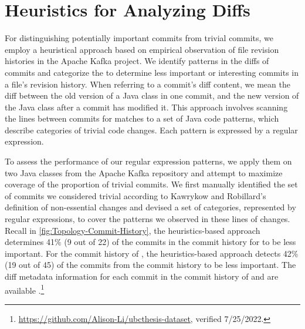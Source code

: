 \section{Heuristics for Analyzing Diffs}
\label{sec:Heuristics}

For distinguishing potentially important commits from trivial commits, 
we employ a heuristical approach based on empirical observation of file revision histories in the Apache Kafka project.
We identify patterns in the diffs of commits and categorize the  
to determine less important or interesting commits in a file's revision history.
When referring to a commit's diff content, we mean the diff between the old version of a Java class in one commit, 
and the new version of the Java class after a commit has modified it.
This approach involves scanning the lines between commits for matches to a set of Java code patterns, 
which describe categories of trivial code changes.
Each pattern is expressed by a regular expression.

To assess the performance of our regular expression patterns, 
we apply them on two Java classes from the Apache Kafka repository and attempt to maximize coverage of the proportion of trivial commits.
We first manually identified the set of commits we considered trivial according to Kawrykow and Robillard's definition of non-essential changes \cite{kawrykow_non-essential_2011} and devised a set of categories, represented by regular expressions, to cover the patterns we observed in these lines of changes.
Recall in \autoref{fig:Topology-Commit-History}, the heuristics-based approach determines 41\% (9 out of 22) of the commits in the commit history for  to be less important.
For the commit history of , the heuristics-based approach detects 42\% (19 out of 45) of the commits from the commit history to be less important.
The diff metadata information for each commit in the commit history of  
and  are available .\footnote{\url{https://github.com/Alison-Li/ubcthesis-dataset}, verified 7/25/2022.}

